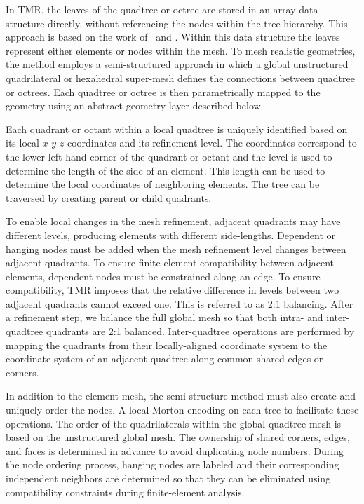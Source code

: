 \documentclass[12pt]{article}
\begin{document}
In TMR, the leaves of the quadtree or octree are stored in an array data structure directly, without referencing the nodes within the tree hierarchy. 
This approach is based on the work of~\citet{BursteddeWilcoxGhattas11} and 
\citet{IsaacBursteddeWilcoxEtAl15}.
Within this data structure the leaves represent either elements or nodes within the mesh.
To mesh realistic geometries, the method employs a semi-structured approach in which a global unstructured quadrilateral or hexahedral super-mesh defines the connections between quadtree or octrees.
Each quadtree or octree is then parametrically mapped to the geometry using an abstract geometry layer described below.

Each quadrant or octant within a local quadtree is uniquely identified based on its local $x$-$y$-$z$ coordinates and its refinement level. 
The coordinates correspond to the lower left hand corner of the quadrant or octant and the level is used to determine the length of the side of an element. 
This length can be used to determine the local coordinates of neighboring elements.
The tree can be traversed by creating parent or child quadrants. 

To enable local changes in the mesh refinement, adjacent quadrants may have different levels, producing elements with different side-lengths.
Dependent or hanging nodes must be added when the mesh refinement level changes between adjacent
quadrants. 
To ensure finite-element compatibility between adjacent elements, dependent nodes must be constrained along an edge.  
To ensure compatibility, TMR imposes that the relative difference in levels between two adjacent quadrants cannot exceed one. 
This is referred to as 2:1 balancing. 
After a refinement step, we balance the full global mesh so that both intra- and inter-quadtree quadrants are 2:1 balanced. 
Inter-quadtree operations are performed by mapping the quadrants from their locally-aligned coordinate system to the coordinate system of an adjacent quadtree along common shared edges or corners.

In addition to the element mesh, the semi-structure method must also create and uniquely order the nodes. 
A local Morton encoding on each tree to facilitate these operations. 
The order of the quadrilaterals within the global quadtree mesh is based on the
unstructured global mesh. 
The ownership of shared corners, edges, and faces is determined in advance to avoid duplicating node numbers. 
During the node ordering process, hanging nodes are labeled and their corresponding independent neighbors are determined so that they can be eliminated using compatibility constraints during finite-element analysis.
\end{document}
